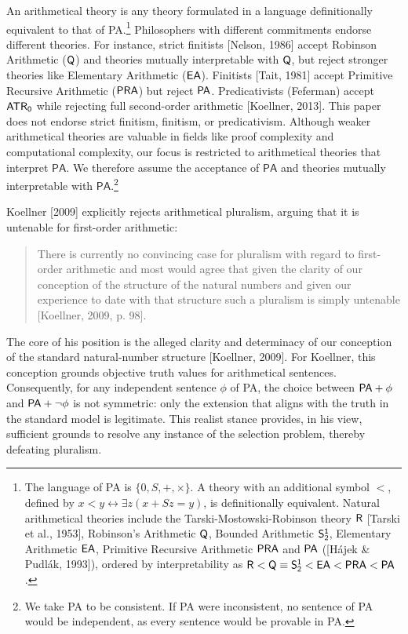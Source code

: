 \documentclass[a4paper,12pt]{amsart}
\theoremstyle{definition}
\numberwithin{equation}{section}
\begin{document}
An arithmetical theory is any theory formulated in a language definitionally equivalent to that of {\sf PA}.\footnote{The language of {\sf PA} is $\{0, S, +, \times\}$. A theory with an additional symbol $<$, defined by $x < y \leftrightarrow \exists z (x + Sz = y)$, is definitionally equivalent.  Natural arithmetical theories include the Tarski-Mostowski-Robinson theory $\sf R$ [Tarski et al., 1953], Robinson's Arithmetic $\sf Q$, Bounded Arithmetic $\sf S^1_2$, Elementary Arithmetic $\sf EA$, Primitive Recursive Arithmetic $\sf PRA$ and $\sf PA$ ([H\'{a}jek \& Pudl\'{a}k, 1993]), ordered by interpretability as $\mathsf{R}<\mathsf{Q}\equiv {\sf S^1_2}< \mathsf{EA}< \mathsf{PRA}< \mathsf{PA}$.} Philosophers with different commitments endorse different theories. For instance, strict finitists [Nelson, 1986] accept Robinson Arithmetic  ($\sf Q$) and theories mutually interpretable with $\sf Q$, but reject stronger theories like Elementary Arithmetic ($\sf EA$). Finitists [Tait, 1981] accept Primitive Recursive Arithmetic ($\sf PRA$) but reject $\sf PA$.  Predicativists (Feferman) accept $\sf ATR_0$ while rejecting full second-order arithmetic [Koellner, 2013]. This paper does not endorse strict finitism, finitism, or predicativism. Although weaker arithmetical theories are valuable in fields like proof complexity and computational complexity, our focus is restricted to arithmetical theories that interpret $\mathsf{PA}$.  We therefore assume the acceptance of $\mathsf{PA}$ and theories mutually interpretable with $\mathsf{PA}$.\footnote{We take {\sf PA} to be consistent. If {\sf PA} were inconsistent, no sentence of {\sf PA} would be independent, as every sentence would be provable in {\sf PA}.}



Koellner [2009] explicitly rejects arithmetical pluralism, arguing that it is untenable for first-order arithmetic: 
\begin{quote} 
\small
There is currently no convincing case for pluralism with regard to first-order arithmetic and most would agree that given the clarity of our conception of the structure of the natural numbers and given our experience to date with that structure such a pluralism is simply untenable [Koellner, 2009, p. 98].
\end{quote}

The core of his position is the alleged clarity and determinacy of our conception of the standard natural-number structure [Koellner, 2009].  For Koellner, this conception grounds objective truth values for arithmetical sentences.   Consequently, for any independent sentence $\phi$ of {\sf PA}, the choice between ${\sf PA} + \phi$ and ${\sf PA} + \neg\phi$ is not symmetric: only the extension that aligns with the truth in the standard model is legitimate. This realist stance provides, in his view, sufficient grounds to resolve any instance of the selection problem, thereby defeating pluralism.
\end{document}
